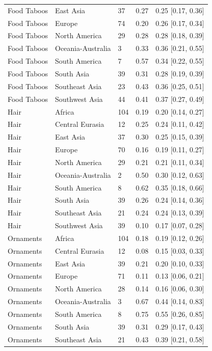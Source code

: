 \begin{longtable}{lllll}
Food Taboos & East Asia & 37 & 0.27 & 0.25 [0.17, 0.36] \\
Food Taboos & Europe & 74 & 0.20 & 0.26 [0.17, 0.34] \\
Food Taboos & North America & 29 & 0.28 & 0.28 [0.18, 0.39] \\
Food Taboos & Oceania-Australia & 3 & 0.33 & 0.36 [0.21, 0.55] \\
Food Taboos & South America & 7 & 0.57 & 0.34 [0.22, 0.55] \\
Food Taboos & South Asia & 39 & 0.31 & 0.28 [0.19, 0.39] \\
Food Taboos & Southeast Asia & 23 & 0.43 & 0.36 [0.25, 0.51] \\
Food Taboos & Southwest Asia & 44 & 0.41 & 0.37 [0.27, 0.49] \\
Hair & Africa & 104 & 0.19 & 0.20 [0.14, 0.27] \\
Hair & Central Eurasia & 12 & 0.25 & 0.24 [0.11, 0.42] \\
Hair & East Asia & 37 & 0.30 & 0.25 [0.15, 0.39] \\
Hair & Europe & 70 & 0.16 & 0.19 [0.11, 0.27] \\
Hair & North America & 29 & 0.21 & 0.21 [0.11, 0.34] \\
Hair & Oceania-Australia & 2 & 0.50 & 0.30 [0.12, 0.63] \\
Hair & South America & 8 & 0.62 & 0.35 [0.18, 0.66] \\
Hair & South Asia & 39 & 0.26 & 0.24 [0.14, 0.36] \\
Hair & Southeast Asia & 21 & 0.24 & 0.24 [0.13, 0.39] \\
Hair & Southwest Asia & 39 & 0.10 & 0.17 [0.07, 0.28] \\
Ornaments & Africa & 104 & 0.18 & 0.19 [0.12, 0.26] \\
Ornaments & Central Eurasia & 12 & 0.08 & 0.15 [0.03, 0.33] \\
Ornaments & East Asia & 39 & 0.21 & 0.20 [0.10, 0.33] \\
Ornaments & Europe & 71 & 0.11 & 0.13 [0.06, 0.21] \\
Ornaments & North America & 28 & 0.14 & 0.16 [0.06, 0.30] \\
Ornaments & Oceania-Australia & 3 & 0.67 & 0.44 [0.14, 0.83] \\
Ornaments & South America & 8 & 0.75 & 0.55 [0.26, 0.85] \\
Ornaments & South Asia & 39 & 0.31 & 0.29 [0.17, 0.43] \\
Ornaments & Southeast Asia & 21 & 0.43 & 0.39 [0.21, 0.58] \\

\end{longtable}
